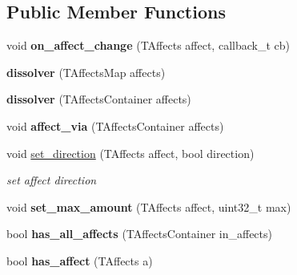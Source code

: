 \subsection*{Public Member Functions}
\begin{DoxyCompactItemize}
\item 
\mbox{\label{structmods_1_1affects_1_1dissolver_a7cda3d45be180cda49e40179e02bf37b}} 
void {\bfseries on\+\_\+affect\+\_\+change} (T\+Affects affect, callback\+\_\+t cb)
\item 
\mbox{\label{structmods_1_1affects_1_1dissolver_a539dff8baaec99e0a72fb898dae01299}} 
{\bfseries dissolver} (T\+Affects\+Map affects)
\item 
\mbox{\label{structmods_1_1affects_1_1dissolver_abc41a2519c4f683ed6211ee760a9f746}} 
{\bfseries dissolver} (T\+Affects\+Container affects)
\item 
\mbox{\label{structmods_1_1affects_1_1dissolver_a382f4ebb292806a3aca5635122cb9de1}} 
void {\bfseries affect\+\_\+via} (T\+Affects\+Container affects)
\item 
void \hyperlink{structmods_1_1affects_1_1dissolver_a35c94d35d686bf871fd29aba834ec150}{set\+\_\+direction} (T\+Affects affect, bool direction)
\begin{DoxyCompactList}\small\item\em set affect direction \end{DoxyCompactList}\item 
\mbox{\label{structmods_1_1affects_1_1dissolver_a0f93b582346b0ca6096b90d16c8062e2}} 
void {\bfseries set\+\_\+max\+\_\+amount} (T\+Affects affect, uint32\+\_\+t max)
\item 
\mbox{\label{structmods_1_1affects_1_1dissolver_a552da19095c0caddb9fb0bc5aa233776}} 
bool {\bfseries has\+\_\+all\+\_\+affects} (T\+Affects\+Container in\+\_\+affects)
\item 
\mbox{\label{structmods_1_1affects_1_1dissolver_aea716f0b8cf0fea7ef48e829b2b8c8d1}} 
bool {\bfseries has\+\_\+affect} (T\+Affects a)

\end{DoxyCompactItemize}
